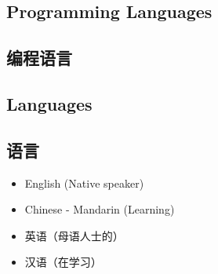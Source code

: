 \begin{xen}
\section{Programming Languages}
\end{xen}
\begin{xcn}
\section{编程语言}
\end{xcn}
\begin{xen}
\section{Languages}
\end{xen}
\begin{xcn}
\section{语言}
\end{xcn}
\begin{xen}
    \begin{itemize}
        \item English (Native speaker)
        \item Chinese - Mandarin (Learning)
    \end{itemize}
\end{xen}
\begin{xcn}
    \begin{itemize}
        \item 英语（母语人士的）
        \item 汉语（在学习）
    \end{itemize}
\end{xcn}
